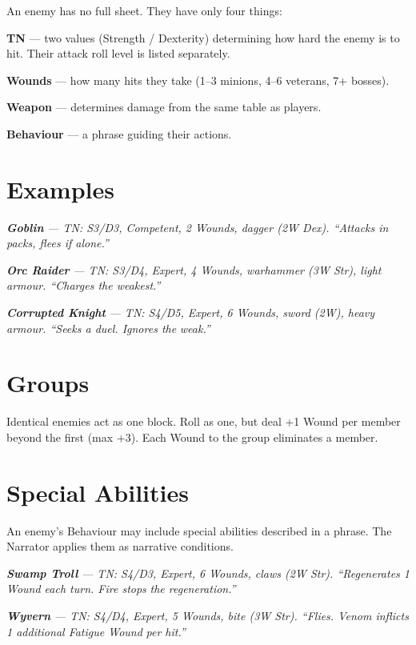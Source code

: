 \documentclass[10pt,a4paper]{article}
\begin{document}

An enemy has no full sheet. They have only four things:


\textbf{TN} — two values (Strength / Dexterity) determining how hard the enemy is to hit. Their attack roll level is listed separately.


\textbf{Wounds} — how many hits they take (1–3 minions, 4–6 veterans, 7+ bosses).


\textbf{Weapon} — determines damage from the same table as players.


\textbf{Behaviour} — a phrase guiding their actions.


\section*{Examples}

\textbf{\textit{Goblin}}\textit{ — TN: S3/D3, Competent, 2 Wounds, dagger (2W Dex). “Attacks in packs, flees if alone.”}


\textbf{\textit{Orc Raider}}\textit{ — TN: S3/D4, Expert, 4 Wounds, warhammer (3W Str), light armour. “Charges the weakest.”}


\textbf{\textit{Corrupted Knight}}\textit{ — TN: S4/D5, Expert, 6 Wounds, sword (2W), heavy armour. “Seeks a duel. Ignores the} \textit{weak.”}


\section*{Groups}

Identical enemies act as one block. Roll as one, but deal +1 Wound per member beyond the first (max +3). Each Wound to the group eliminates a member.


\section*{Special Abilities}

An enemy's Behaviour may include special abilities described in a phrase. The Narrator applies them as narrative conditions.


\textbf{\textit{Swamp Troll}}\textit{ — TN: S4/D3, Expert, 6 Wounds, claws (2W Str). “Regenerates 1 Wound each turn. Fire stops} \textit{the regeneration.”}


\textbf{\textit{Wyvern}}\textit{ — TN: S4/D4, Expert, 5 Wounds, bite (3W Str). “Flies. Venom inflicts 1 additional Fatigue Wound} \textit{per hit.”}
\end{document}
